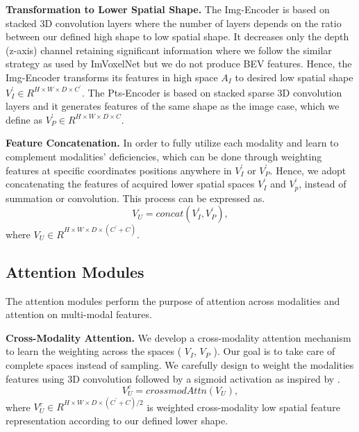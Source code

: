 \documentclass[10pt,twocolumn,letterpaper]{article}
\begin{document}
\textbf{Transformation to Lower Spatial Shape.}
%
The Img-Encoder is based on stacked 3D convolution layers where the number of layers depends on the ratio between our defined high shape to low spatial shape. It decreases only the depth (z-axis) channel retaining significant information where we follow the similar strategy as used by ImVoxelNet \cite{rukhovich2022imvoxelnet} but we do not produce BEV features. Hence, the Img-Encoder transforms its features in high space $A_I$ to desired low spatial shape $V^\prime_I \in R^{H\times W\times D \times C^\prime}$.
%
The Pts-Encoder is based on stacked sparse 3D convolution layers and it generates features of the same shape as the image case, which we define as  $V^\prime_P \in R^{H\times W\times D \times C}$.

\textbf{Feature Concatenation.}
%
In order to fully utilize each modality and learn to complement modalities' deficiencies, which can be done through weighting features at specific coordinates positions anywhere in $V^\prime_I$ or $V^\prime_P$. Hence, we adopt concatenating the features of acquired lower spatial spaces $V^\prime_I$ and $V^\prime_p$, instead of summation or convolution. This process can be expressed as.
\begin{equation}
    V_U = concat(V^\prime_I,V^\prime_P),  
    \label{concate_equation}
\end{equation}
 where $V_U \in R^{H\times W\times D \times (C^\prime + C) }$. 


\subsection{Attention Modules}
The attention modules perform the purpose of attention across modalities and attention on multi-modal features.

\textbf{Cross-Modality Attention.}
%
We develop a cross-modality attention mechanism to learn the weighting across the spaces ( $V_I$, $V_P$ ). Our goal is to take care of complete spaces instead of sampling. We carefully design to weight the modalities features using 3D convolution followed by a sigmoid activation as inspired by \cite{fu2019dual, oktay2018attention}.
\begin{equation}
    V^c_{U} = crossmodAttn(V_U),  
    \label{crossmodAttn_equation}
\end{equation}
 where $V^c_{U} \in R^{H\times W\times D \times (C^\prime + C)/2}$ is weighted cross-modality low spatial feature representation according to our defined lower shape. 
\end{document}
